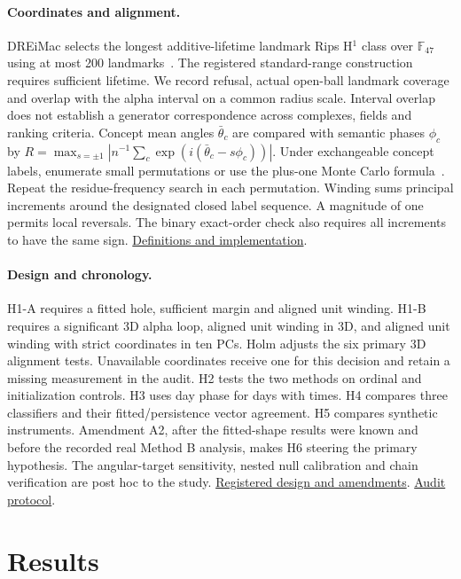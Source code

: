 \documentclass[10pt]{article}
\newcommand{\evidence}[2]{\href{https://github.com/BurnyCoder/topology-of-neural-geometry-in-llm-mechanistic-interpretability/blob/main/#1}{#2}}
\begin{document}
\paragraph{Coordinates and alignment.}
DREiMac selects the longest additive-lifetime landmark Rips H$^1$ class over $\mathbb F_{47}$ using at most 200 landmarks~\citep{perea2023dreimac}. The registered standard-range construction requires sufficient lifetime. We record refusal, actual open-ball landmark coverage and overlap with the alpha interval on a common radius scale. Interval overlap does not establish a generator correspondence across complexes, fields and ranking criteria. Concept mean angles $\bar\theta_c$ are compared with semantic phases $\phi_c$ by $R=\max_{s=\pm1}|n^{-1}\sum_c\exp(i(\bar\theta_c-s\phi_c))|$. Under exchangeable concept labels, enumerate small permutations or use the plus-one Monte Carlo formula~\citep{phipson2010permutation}. Repeat the residue-frequency search in each permutation. Winding sums principal increments around the designated closed label sequence. A magnitude of one permits local reversals. The binary exact-order check also requires all increments to have the same sign. \evidence{src/neurotopo/stats/circular.py}{Definitions and implementation}.

\paragraph{Design and chronology.}
H1-A requires a fitted hole, sufficient margin and aligned unit winding. H1-B requires a significant 3D alpha loop, aligned unit winding in 3D, and aligned unit winding with strict coordinates in ten PCs. Holm adjusts the six primary 3D alignment tests. Unavailable coordinates receive one for this decision and retain a missing measurement in the audit. H2 tests the two methods on ordinal and initialization controls. H3 uses day phase for days with times. H4 compares three classifiers and their fitted/persistence vector agreement. H5 compares synthetic instruments. Amendment A2, after the fitted-shape results were known and before the recorded real Method B analysis, makes H6 steering the primary hypothesis. The angular-target sensitivity, nested null calibration and chain verification are post hoc to the study. \evidence{reports/preregistration.md}{Registered design and amendments}. \evidence{reports/reviews/2026-11-26-protocol.md}{Audit protocol}.

\section{Results}
\end{document}
